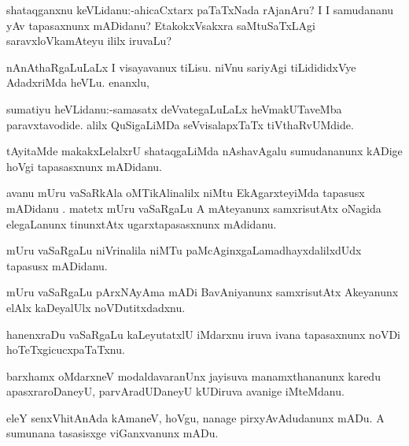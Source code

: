 \documentclass{article}
\begin{document}
\begin{mn}%
shataqganxnu keVLidanu:-ahicaCxtarx paTaTxNada rAjanAru? I I samudananu yAv tapasaxnunx 
mADidanu? EtakokxVsakxra saMtuSaTxLAgi saravxloVkamAteyu ililx iruvaLu?
\end{mn}

\begin{mn}%
nAnAthaRgaLuLaLx I visayavanux tiLisu. niVnu sariyAgi tiLidididxVye AdadxriMda heVLu. 
enanxlu,
\end{mn}

\begin{mn}%
sumatiyu heVLidanu:-samasatx deVvategaLuLaLx heVmakUTaveMba paravxtavodide. alilx 
QuSigaLiMDa seVvisalapxTaTx tiVthaRvUMdide.
\end{mn}

\begin{mn}%
tAyitaMde makakxLelalxrU shataqgaLiMda nAshavAgalu sumudananunx kADige hoVgi tapasasxnunx 
mADidanu.
\end{mn}

\begin{mn}%
avanu mUru vaSaRkAla oMTikAlinalilx niMtu EkAgarxteyiMda tapasusx mADidanu . matetx mUru 
vaSaRgaLu A mAteyanunx samxrisutAtx oNagida elegaLanunx tinunxtAtx ugarxtapasasxnunx 
mAdidanu.
\end{mn}

\begin{mn}%
mUru vaSaRgaLu niVrinalila niMTu paMcAginxgaLamadhayxdalilxdUdx tapasusx mADidanu.
\end{mn}

\begin{mn}%
mUru vaSaRgaLu pArxNAyAma mADi BavAniyanunx samxrisutAtx Akeyanunx elAlx kaDeyalUlx 
noVDutitxdadxnu.
\end{mn}

\begin{mn}%
hanenxraDu vaSaRgaLu kaLeyutatxlU iMdarxnu iruva ivana tapasaxnunx noVDi 
hoTeTxgicucxpaTaTxnu.
\end{mn}

\begin{mn}%
barxhamx oMdarxneV modaldavaranUnx jayisuva manamxthananunx karedu apasxraroDaneyU, 
parvAradUDaneyU kUDiruva avanige iMteMdanu.
\end{mn}

\begin{mn}%
eleY senxVhitAnAda kAmaneV, hoVgu, nanage pirxyAvAdudanunx mADu. A sumunana tasasisxge 
viGanxvanunx mADu.
\end{mn}
\end{document}
